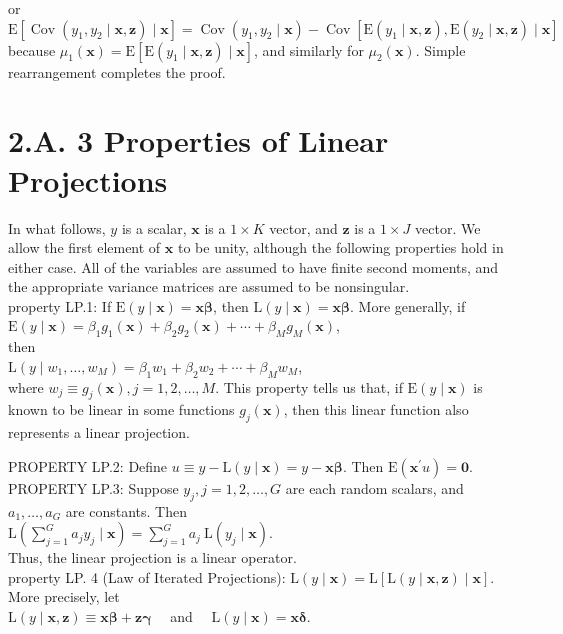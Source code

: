 \documentclass[10pt]{article}
\begin{document}
or\\
$\mathrm{E}\left[\operatorname{Cov}\left(y_{1}, y_{2} \mid \mathbf{x}, \mathbf{z}\right) \mid \mathbf{x}\right]=\operatorname{Cov}\left(y_{1}, y_{2} \mid \mathbf{x}\right)-\operatorname{Cov}\left[\mathrm{E}\left(y_{1} \mid \mathbf{x}, \mathbf{z}\right), \mathrm{E}\left(y_{2} \mid \mathbf{x}, \mathbf{z}\right) \mid \mathbf{x}\right]$\\
because $\mu_{1}(\mathbf{x})=\mathrm{E}\left[\mathrm{E}\left(y_{1} \mid \mathbf{x}, \mathbf{z}\right) \mid \mathbf{x}\right]$, and similarly for $\mu_{2}(\mathbf{x})$. Simple rearrangement completes the proof.

\section*{2.A. 3 Properties of Linear Projections}
In what follows, $y$ is a scalar, $\mathbf{x}$ is a $1 \times K$ vector, and $\mathbf{z}$ is a $1 \times J$ vector. We allow the first element of $\mathbf{x}$ to be unity, although the following properties hold in either case. All of the variables are assumed to have finite second moments, and the appropriate variance matrices are assumed to be nonsingular.\\
property LP.1: If $\mathrm{E}(y \mid \mathbf{x})=\mathbf{x} \boldsymbol{\beta}$, then $\mathrm{L}(y \mid \mathbf{x})=\mathbf{x} \boldsymbol{\beta}$. More generally, if\\
$\mathrm{E}(y \mid \mathbf{x})=\beta_{1} g_{1}(\mathbf{x})+\beta_{2} g_{2}(\mathbf{x})+\cdots+\beta_{M} g_{M}(\mathbf{x})$,\\
then\\
$\mathrm{L}\left(y \mid w_{1}, \ldots, w_{M}\right)=\beta_{1} w_{1}+\beta_{2} w_{2}+\cdots+\beta_{M} w_{M}$,\\
where $w_{j} \equiv g_{j}(\mathbf{x}), j=1,2, \ldots, M$. This property tells us that, if $\mathrm{E}(y \mid \mathbf{x})$ is known to be linear in some functions $g_{j}(\mathbf{x})$, then this linear function also represents a linear projection.

PROPERTY LP.2: Define $u \equiv y-\mathrm{L}(y \mid \mathbf{x})=y-\mathbf{x} \boldsymbol{\beta}$. Then $\mathrm{E}\left(\mathbf{x}^{\prime} u\right)=\mathbf{0}$.\\
PROPERTY LP.3: Suppose $y_{j}, j=1,2, \ldots, G$ are each random scalars, and $a_{1}, \ldots, a_{G}$ are constants. Then\\
$\mathrm{L}\left(\sum_{j=1}^{G} a_{j} y_{j} \mid \mathbf{x}\right)=\sum_{j=1}^{G} a_{j} \mathrm{~L}\left(y_{j} \mid \mathbf{x}\right)$.\\
Thus, the linear projection is a linear operator.\\
property LP. 4 (Law of Iterated Projections): $\mathrm{L}(y \mid \mathbf{x})=\mathrm{L}[\mathrm{L}(y \mid \mathbf{x}, \mathbf{z}) \mid \mathbf{x}]$. More precisely, let\\
$\mathrm{L}(y \mid \mathbf{x}, \mathbf{z}) \equiv \mathbf{x} \boldsymbol{\beta}+\mathbf{z} \boldsymbol{\gamma} \quad$ and $\quad \mathrm{L}(y \mid \mathbf{x})=\mathbf{x} \boldsymbol{\delta}$.
\end{document}
